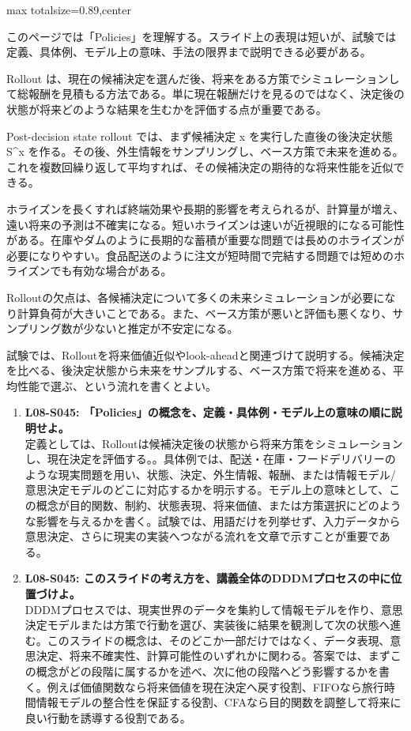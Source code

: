 \begin{minipage}[t]{0.58\textwidth}
\begin{adjustbox}{max totalsize={\textwidth}{0.89\textheight},center}
\begin{minipage}{\textwidth}\scriptsize
{}このページでは「Policies」を理解する。スライド上の表現は短いが、試験では定義、具体例、モデル上の意味、手法の限界まで説明できる必要がある。\par
Rollout は、現在の候補決定を選んだ後、将来をある方策でシミュレーションして総報酬を見積もる方法である。単に現在報酬だけを見るのではなく、決定後の状態が将来どのような結果を生むかを評価する点が重要である。\par
Post-decision state rollout では、まず候補決定 x を実行した直後の後決定状態 S\textasciicircum{}x を作る。その後、外生情報をサンプリングし、ベース方策で未来を進める。これを複数回繰り返して平均すれば、その候補決定の期待的な将来性能を近似できる。\par
ホライズンを長くすれば終端効果や長期的影響を考えられるが、計算量が増え、遠い将来の予測は不確実になる。短いホライズンは速いが近視眼的になる可能性がある。在庫やダムのように長期的な蓄積が重要な問題では長めのホライズンが必要になりやすい。食品配送のように注文が短時間で完結する問題では短めのホライズンでも有効な場合がある。\par
Rolloutの欠点は、各候補決定について多くの未来シミュレーションが必要になり計算負荷が大きいことである。また、ベース方策が悪いと評価も悪くなり、サンプリング数が少ないと推定が不安定になる。\par
試験では、Rolloutを将来価値近似やlook-aheadと関連づけて説明する。候補決定を比べる、後決定状態から未来をサンプルする、ベース方策で将来を進める、平均性能で選ぶ、という流れを書くとよい。\par{}\begin{enumerate}\item \textbf{L08-S045: 「Policies」の概念を、定義・具体例・モデル上の意味の順に説明せよ。}\\定義としては、Rolloutは候補決定後の状態から将来方策をシミュレーションし、現在決定を評価する。。具体例では、配送・在庫・フードデリバリーのような現実問題を用い、状態、決定、外生情報、報酬、または情報モデル/意思決定モデルのどこに対応するかを明示する。モデル上の意味として、この概念が目的関数、制約、状態表現、将来価値、または方策選択にどのような影響を与えるかを書く。試験では、用語だけを列挙せず、入力データから意思決定、さらに現実の実装へつながる流れを文章で示すことが重要である。\item \textbf{L08-S045: このスライドの考え方を、講義全体のDDDMプロセスの中に位置づけよ。}\\DDDMプロセスでは、現実世界のデータを集約して情報モデルを作り、意思決定モデルまたは方策で行動を選び、実装後に結果を観測して次の状態へ進む。このスライドの概念は、そのどこか一部だけではなく、データ表現、意思決定、将来不確実性、計算可能性のいずれかに関わる。答案では、まずこの概念がどの段階に属するかを述べ、次に他の段階へどう影響するかを書く。例えば価値関数なら将来価値を現在決定へ戻す役割、FIFOなら旅行時間情報モデルの整合性を保証する役割、CFAなら目的関数を調整して将来に良い行動を誘導する役割である。\end{enumerate}

\end{minipage}
\end{adjustbox}
\end{minipage}
